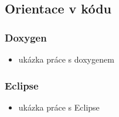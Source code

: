 \subsection{Orientace v kódu}

\begin{frame}
	\frametitle{Doxygen}
	\begin{itemize}
		\item{ukázka práce s doxygenem}
	\end{itemize}
\end{frame}

\begin{frame}
	\frametitle{Eclipse}
	\begin{itemize}
		\item{ukázka práce s Eclipse}
	\end{itemize}
\end{frame}




